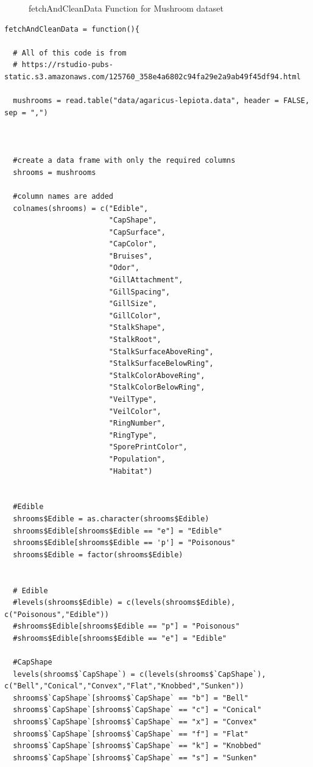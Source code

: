 \documentclass[10pt  ,usenames, dvipsnames]{article}\usepackage[]{graphicx}\usepackage[]{color}
\begin{document}
\begin{figure}[H]
\caption {fetchAndCleanData Function for Mushroom dataset}
\end {figure}
    \begin{lstlisting}
fetchAndCleanData = function(){
  
  # All of this code is from
  # https://rstudio-pubs-static.s3.amazonaws.com/125760_358e4a6802c94fa29e2a9ab49f45df94.html
  
  mushrooms = read.table("data/agaricus-lepiota.data", header = FALSE, sep = ",")
  
  
  
  #create a data frame with only the required columns
  shrooms = mushrooms
  
  #column names are added
  colnames(shrooms) = c("Edible",
                        "CapShape",
                        "CapSurface",
                        "CapColor",
                        "Bruises",                        
                        "Odor",
                        "GillAttachment",
                        "GillSpacing",
                        "GillSize",
                        "GillColor",
                        "StalkShape",
                        "StalkRoot",
                        "StalkSurfaceAboveRing",
                        "StalkSurfaceBelowRing",
                        "StalkColorAboveRing",
                        "StalkColorBelowRing",
                        "VeilType",
                        "VeilColor",
                        "RingNumber",
                        "RingType",
                        "SporePrintColor",
                        "Population",
                        "Habitat")
  
  
  #Edible
  shrooms$Edible = as.character(shrooms$Edible)
  shrooms$Edible[shrooms$Edible == "e"] = "Edible"
  shrooms$Edible[shrooms$Edible == 'p'] = "Poisonous"
  shrooms$Edible = factor(shrooms$Edible)
  
  
  # Edible
  #levels(shrooms$Edible) = c(levels(shrooms$Edible), c("Poisonous","Edible"))
  #shrooms$Edible[shrooms$Edible == "p"] = "Poisonous"
  #shrooms$Edible[shrooms$Edible == "e"] = "Edible"
  
  #CapShape
  levels(shrooms$`CapShape`) = c(levels(shrooms$`CapShape`), c("Bell","Conical","Convex","Flat","Knobbed","Sunken"))
  shrooms$`CapShape`[shrooms$`CapShape` == "b"] = "Bell"
  shrooms$`CapShape`[shrooms$`CapShape` == "c"] = "Conical"
  shrooms$`CapShape`[shrooms$`CapShape` == "x"] = "Convex"
  shrooms$`CapShape`[shrooms$`CapShape` == "f"] = "Flat"
  shrooms$`CapShape`[shrooms$`CapShape` == "k"] = "Knobbed"
  shrooms$`CapShape`[shrooms$`CapShape` == "s"] = "Sunken"
  

\end{lstlisting}
\end{document}
